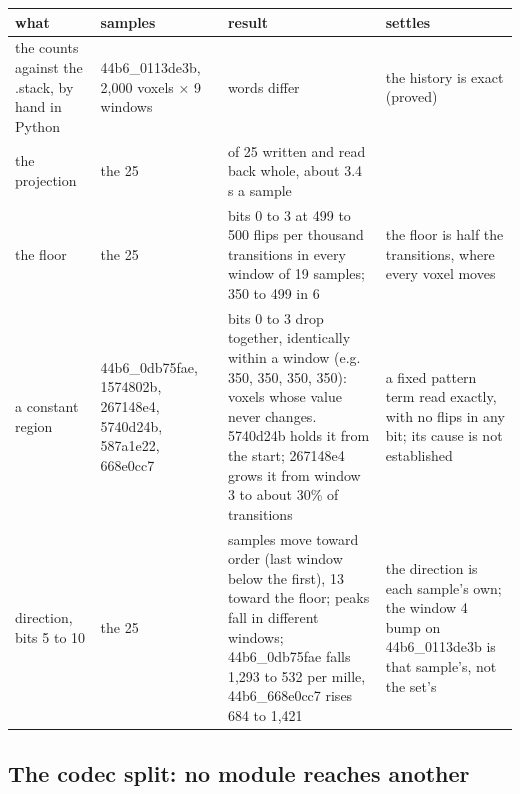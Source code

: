 {\footnotesize
\setlength{\tabcolsep}{6pt}
\begin{longtable}{>{\RaggedRight\arraybackslash}p{}>{\RaggedRight\arraybackslash}p{}>{\RaggedRight\arraybackslash}p{}>{\RaggedRight\arraybackslash}p{}}
\toprule
what & samples & result & settles \\
\midrule
\endhead
the counts against the .stack, by hand in Python & 44b6\_\allowbreak{}0113de3b, 2,000 voxels × 9 windows & 0 words differ & the history is exact (proved) \\
the projection & the 25 & 25 of 25 written and read back whole, about 3.4 s a sample &  \\
the floor & the 25 & bits 0 to 3 at 499 to 500 flips per thousand transitions in every window of 19 samples; 350 to 499 in 6 & the floor is half the transitions, where every voxel moves \\
a constant region & 44b6\_\allowbreak{}0db75fae, 1574802b, 267148e4, 5740d24b, 587a1e22, 668e0cc7 & bits 0 to 3 drop together, identically within a window (e.g. 350, 350, 350, 350): voxels whose value never changes. 5740d24b holds it from the start; 267148e4 grows it from window 3 to about 30\% of transitions & a fixed pattern term read exactly, with no flips in any bit; its cause is not established \\
direction, bits 5 to 10 & the 25 & 12 samples move toward order (last window below the first), 13 toward the floor; peaks fall in different windows; 44b6\_\allowbreak{}0db75fae falls 1,293 to 532 per mille, 44b6\_\allowbreak{}668e0cc7 rises 684 to 1,421 & the direction is each sample's own; the window 4 bump on 44b6\_\allowbreak{}0113de3b is that sample's, not the set's \\
\bottomrule
\end{longtable}
}

\subsection{\texorpdfstring{The codec split: no module reaches another}{The codec split: no module reaches another}}

